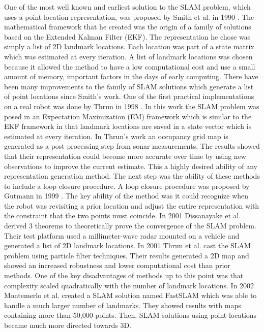 \documentclass[12pt]{article}
\begin{document}
One of the most well known and earliest solution to the SLAM problem, which
uses a point location representation, was proposed by Smith et al. in 1990
\cite{Smith1990}. The mathematical framework that he created was the origin
of a family of solutions based on the Extended Kalman Filter (EKF). The
representation he chose was simply a list of 2D landmark locations. Each
location was part of a state matrix which was estimated at every iteration.
A list of landmark locations was chosen because it allowed the method to
have a low computational cost and use a small amount of memory, important
factors in the days of early computing. There have been many improvements
to the family of SLAM solutions which generate a list of point locations
since Smith's work. One of the first practical implementations on a real
robot was done by Thrun in 1998 \cite{Thrun1998}. In this work the SLAM
problem was posed in an Expectation Maximization (EM) framework which is
similar to the EKF framework in that landmark locations are saved
in a state vector which is estimated at every iteration. In Thrun's work an
occupancy grid map is generated as a post processing step from sonar
measurements. The results showed that their representation could become
more accurate over time by using new observations to improve the current
estimate. This a highly desired ability of any representation generation
method. The next step was the ability of these methods to include a loop
closure procedure. A loop closure procedure was proposed by Gutmann in 1999
\cite{Gutmann1999}. The key ability of the method was it could recognize
when the robot was revisiting a prior location and adjust the entire
representation with the constraint that the two points must coincide. In
2001 Dissanayake et al. \cite{Dissanayake2001} derived 3 theorems to
theoretically prove the convergence of the SLAM problem. Their test
platform used a millimeter-wave radar mounted on a vehicle and generated a
list of 2D landmark locations. In 2001 Thrun et al. \cite{Thrun2001} cast
the SLAM problem using particle filter techniques. Their results generated
a 2D map and showed an increased robustness and lower computational cost
than prior methods. One of the key disadvantages of methods up to this
point was that complexity scaled quadratically with the number of landmark
locations.  In 2002 Montemerlo et al. \cite{Montemerlo2002} created a SLAM
solution named FastSLAM which was able to handle a much larger number of
landmarks. They showed results with maps containing more than 50,000
points. Then, SLAM solutions using point locations became much more
directed towards 3D.  
\end{document}

